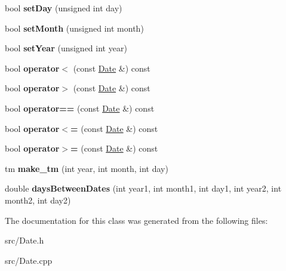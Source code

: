 \begin{DoxyCompactItemize}
\item 
\hypertarget{class_date_aff23cb89959285d5743471cfb8de79be}{bool {\bfseries set\+Day} (unsigned int day)}\label{class_date_aff23cb89959285d5743471cfb8de79be}

\item 
\hypertarget{class_date_a317a64663663c32417496549da4b52ef}{bool {\bfseries set\+Month} (unsigned int month)}\label{class_date_a317a64663663c32417496549da4b52ef}

\item 
\hypertarget{class_date_aae265e5db481eaae2859cbfb2b2d4b1f}{bool {\bfseries set\+Year} (unsigned int year)}\label{class_date_aae265e5db481eaae2859cbfb2b2d4b1f}

\item 
\hypertarget{class_date_a691bafd5bba9540f3c540f7327a758c2}{bool {\bfseries operator$<$} (const \hyperlink{class_date}{Date} \&) const }\label{class_date_a691bafd5bba9540f3c540f7327a758c2}

\item 
\hypertarget{class_date_a0bd06d545842c948cdca8ccc60d7d68d}{bool {\bfseries operator$>$} (const \hyperlink{class_date}{Date} \&) const }\label{class_date_a0bd06d545842c948cdca8ccc60d7d68d}

\item 
\hypertarget{class_date_ad54d8e4b8f2ad6df8eda3b8615c3c0b2}{bool {\bfseries operator==} (const \hyperlink{class_date}{Date} \&) const }\label{class_date_ad54d8e4b8f2ad6df8eda3b8615c3c0b2}

\item 
\hypertarget{class_date_a6632fd56fe1c549ef0a257c85fd8eb3e}{bool {\bfseries operator$<$=} (const \hyperlink{class_date}{Date} \&) const }\label{class_date_a6632fd56fe1c549ef0a257c85fd8eb3e}

\item 
\hypertarget{class_date_ae4802fa52cf81f1a259b4a3b88bffc0d}{bool {\bfseries operator$>$=} (const \hyperlink{class_date}{Date} \&) const }\label{class_date_ae4802fa52cf81f1a259b4a3b88bffc0d}

\item 
\hypertarget{class_date_abc8a9987bc7d217fa4115dde6501943d}{tm {\bfseries make\+\_\+tm} (int year, int month, int day)}\label{class_date_abc8a9987bc7d217fa4115dde6501943d}

\item 
\hypertarget{class_date_a8668b035506ac91b585c3ba549f15464}{double {\bfseries days\+Between\+Dates} (int year1, int month1, int day1, int year2, int month2, int day2)}\label{class_date_a8668b035506ac91b585c3ba549f15464}

\end{DoxyCompactItemize}


The documentation for this class was generated from the following files\+:\begin{DoxyCompactItemize}
\item 
src/Date.\+h\item 
src/Date.\+cpp\end{DoxyCompactItemize}
